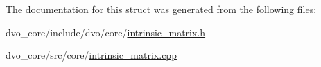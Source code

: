 The documentation for this struct was generated from the following files\+:\begin{DoxyCompactItemize}
\item 
dvo\+\_\+core/include/dvo/core/\mbox{\hyperlink{intrinsic__matrix_8h}{intrinsic\+\_\+matrix.\+h}}\item 
dvo\+\_\+core/src/core/\mbox{\hyperlink{intrinsic__matrix_8cpp}{intrinsic\+\_\+matrix.\+cpp}}\end{DoxyCompactItemize}
